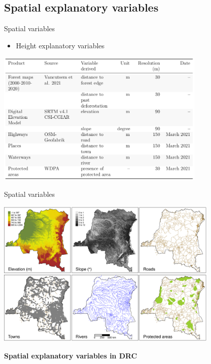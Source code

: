 \documentclass[10pt,table,dvipsnames,compress]{beamer}
\begin{document}
\subsection{Spatial explanatory variables}
\label{sec:org227c2a6}

\begin{frame}[label={sec:org453b1f7}]{Spatial variables}
\begin{itemize}
\item Height explanatory variables
\end{itemize}

\begin{center}
\includegraphics[width=0.75\textwidth]{figs/variables-tab.png}
\end{center}
\end{frame}

\begin{frame}[label={sec:org40757fa}]{Spatial variables}
\begin{center}
\includegraphics[width=0.8\textwidth]{figs/sm/var.png}
\end{center}

\centering \textbf{Spatial explanatory variables in DRC}
\end{frame}
\end{document}
